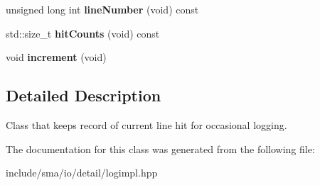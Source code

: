 \begin{DoxyCompactItemize}
\item 
\hypertarget{classel_1_1base_1_1HitCounter_ab43602346f499854b1764b1c2dcb70dc}{unsigned long int {\bfseries line\-Number} (void) const }\label{classel_1_1base_1_1HitCounter_ab43602346f499854b1764b1c2dcb70dc}

\item 
\hypertarget{classel_1_1base_1_1HitCounter_a3df3a285c91b5eb690be48893d677e94}{std\-::size\-\_\-t {\bfseries hit\-Counts} (void) const }\label{classel_1_1base_1_1HitCounter_a3df3a285c91b5eb690be48893d677e94}

\item 
\hypertarget{classel_1_1base_1_1HitCounter_ae2d7709a89362019195761416d510911}{void {\bfseries increment} (void)}\label{classel_1_1base_1_1HitCounter_ae2d7709a89362019195761416d510911}

\end{DoxyCompactItemize}


\subsection{Detailed Description}
Class that keeps record of current line hit for occasional logging. 

The documentation for this class was generated from the following file\-:\begin{DoxyCompactItemize}
\item 
include/sma/io/detail/logimpl.\-hpp\end{DoxyCompactItemize}
